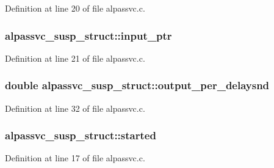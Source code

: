 Definition at line 20 of file alpassvc.\+c.

\subsubsection[{\texorpdfstring{input\+\_\+ptr}{input_ptr}}]{ alpassvc\+\_\+susp\+\_\+struct\+::input\+\_\+ptr}\hypertarget{structalpassvc__susp__struct_add003c360b741741a12d36190e34242a}{}\label{structalpassvc__susp__struct_add003c360b741741a12d36190e34242a}


Definition at line 21 of file alpassvc.\+c.

\subsubsection[{\texorpdfstring{output\+\_\+per\+\_\+delaysnd}{output_per_delaysnd}}]{\setlength{\rightskip}{0pt plus 5cm}double alpassvc\+\_\+susp\+\_\+struct\+::output\+\_\+per\+\_\+delaysnd}\hypertarget{structalpassvc__susp__struct_a16013c5e08f12043c9145d65848420ef}{}\label{structalpassvc__susp__struct_a16013c5e08f12043c9145d65848420ef}


Definition at line 32 of file alpassvc.\+c.

\subsubsection[{\texorpdfstring{started}{started}}]{ alpassvc\+\_\+susp\+\_\+struct\+::started}\hypertarget{structalpassvc__susp__struct_abd37d6d81e7bbba5a2f9d67c540195b8}{}\label{structalpassvc__susp__struct_abd37d6d81e7bbba5a2f9d67c540195b8}


Definition at line 17 of file alpassvc.\+c.

